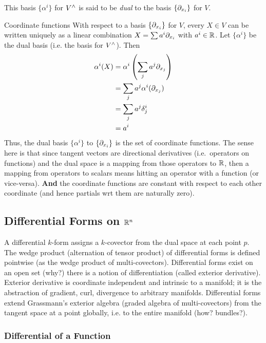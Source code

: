 %
This basis \(\{\alpha^i\}\) for \(V^\wedge\) is said to be \textit{dual} to the basis \(\{\partial_{x_{i}}\}\) for \(V\).
%
\begin{example}{Coordinate functions}{}
    With respect to a basis \(\{\partial_{x_{i}}\}\) for \(V\), every \(X \in V\) can be written uniquely as a linear combination \(X = \sum a^i \partial_{x_i}\) with \(a^i \in \mathbb{R}\). Let \(\{\alpha^i\}\) be the dual basis (i.e. the basis for \(V^\wedge\)).
    Then
    \begin{align*}
        \alpha^i(X) & = \alpha^i \left( \sum_j a^j \partial_{x_{j}} \right) \\
                    & = \sum_j a^j \alpha^i(\partial_{x_{j}})               \\
                    & = \sum_j a^j \delta_j^i                      \\
                    & = a^i
    \end{align*}
    Thus, the dual basis \(\{\alpha^i\}\) to \(\{\partial_{x_{i}}\}\) is the set of coordinate functions.
    The sense here is that since tangent vectors are directional derivatives (i.e.\ operators on functions) and the dual space is a mapping from those operators to \(\mathbb{R}\), then a mapping from operators to scalars means hitting an operator with a function (or vice-versa). \textbf{And} the coordinate functions are constant with respect to each other coordinate (and hence partials wrt them are naturally zero).
\end{example}

\subsection{Differential Forms on \(\mathbb{R}^n\)}

A differential \(k\)-form assigns a \(k\)-covector from the dual space at each point \(p\).
%
The wedge product (alternation of tensor product) of differential forms is defined pointwise (as the wedge product of multi-covectors).
%
Differential forms exist on an open set (why?) there is a notion of differentiation (called exterior derivative).
%
Exterior derivative is coordinate independent and intrinsic to a manifold; it is the abstraction of gradient, curl, divergence to arbitrary manifolds.
%
Differential forms extend Grassmann's exterior algebra (graded algebra of multi-covectors) from the tangent space at a point globally, i.e. to the entire manifold (how? bundles?).

\subsubsection{Differential of a Function}

